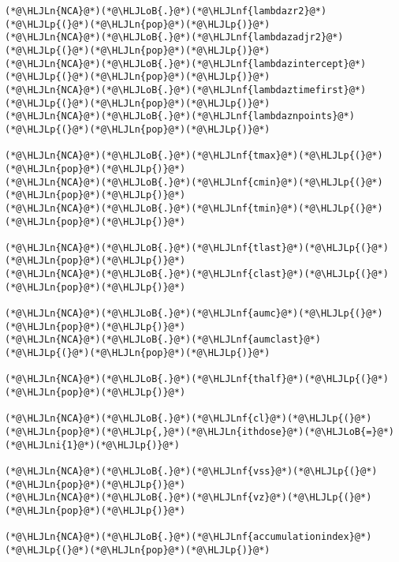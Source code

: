 \documentclass[12pt,a4paper]{article}
\newcommand{\HLJLn}[1]{#1}
\newcommand{\HLJLnf}[1]{\textcolor[RGB]{66,102,213}{#1}}
\newcommand{\HLJLni}[1]{\textcolor[RGB]{59,151,46}{#1}}
\newcommand{\HLJLoB}[1]{\textcolor[RGB]{102,102,102}{\textbf{#1}}}
\newcommand{\HLJLp}[1]{#1}
\begin{document}
\begin{lstlisting}
(*@\HLJLn{NCA}@*)(*@\HLJLoB{.}@*)(*@\HLJLnf{lambdazr2}@*)(*@\HLJLp{(}@*)(*@\HLJLn{pop}@*)(*@\HLJLp{)}@*)
(*@\HLJLn{NCA}@*)(*@\HLJLoB{.}@*)(*@\HLJLnf{lambdazadjr2}@*)(*@\HLJLp{(}@*)(*@\HLJLn{pop}@*)(*@\HLJLp{)}@*)
(*@\HLJLn{NCA}@*)(*@\HLJLoB{.}@*)(*@\HLJLnf{lambdazintercept}@*)(*@\HLJLp{(}@*)(*@\HLJLn{pop}@*)(*@\HLJLp{)}@*)
(*@\HLJLn{NCA}@*)(*@\HLJLoB{.}@*)(*@\HLJLnf{lambdaztimefirst}@*)(*@\HLJLp{(}@*)(*@\HLJLn{pop}@*)(*@\HLJLp{)}@*)
(*@\HLJLn{NCA}@*)(*@\HLJLoB{.}@*)(*@\HLJLnf{lambdaznpoints}@*)(*@\HLJLp{(}@*)(*@\HLJLn{pop}@*)(*@\HLJLp{)}@*)

(*@\HLJLn{NCA}@*)(*@\HLJLoB{.}@*)(*@\HLJLnf{tmax}@*)(*@\HLJLp{(}@*)(*@\HLJLn{pop}@*)(*@\HLJLp{)}@*)
(*@\HLJLn{NCA}@*)(*@\HLJLoB{.}@*)(*@\HLJLnf{cmin}@*)(*@\HLJLp{(}@*)(*@\HLJLn{pop}@*)(*@\HLJLp{)}@*)
(*@\HLJLn{NCA}@*)(*@\HLJLoB{.}@*)(*@\HLJLnf{tmin}@*)(*@\HLJLp{(}@*)(*@\HLJLn{pop}@*)(*@\HLJLp{)}@*)

(*@\HLJLn{NCA}@*)(*@\HLJLoB{.}@*)(*@\HLJLnf{tlast}@*)(*@\HLJLp{(}@*)(*@\HLJLn{pop}@*)(*@\HLJLp{)}@*)
(*@\HLJLn{NCA}@*)(*@\HLJLoB{.}@*)(*@\HLJLnf{clast}@*)(*@\HLJLp{(}@*)(*@\HLJLn{pop}@*)(*@\HLJLp{)}@*)

(*@\HLJLn{NCA}@*)(*@\HLJLoB{.}@*)(*@\HLJLnf{aumc}@*)(*@\HLJLp{(}@*)(*@\HLJLn{pop}@*)(*@\HLJLp{)}@*)
(*@\HLJLn{NCA}@*)(*@\HLJLoB{.}@*)(*@\HLJLnf{aumclast}@*)(*@\HLJLp{(}@*)(*@\HLJLn{pop}@*)(*@\HLJLp{)}@*)

(*@\HLJLn{NCA}@*)(*@\HLJLoB{.}@*)(*@\HLJLnf{thalf}@*)(*@\HLJLp{(}@*)(*@\HLJLn{pop}@*)(*@\HLJLp{)}@*)

(*@\HLJLn{NCA}@*)(*@\HLJLoB{.}@*)(*@\HLJLnf{cl}@*)(*@\HLJLp{(}@*)(*@\HLJLn{pop}@*)(*@\HLJLp{,}@*)(*@\HLJLn{ithdose}@*)(*@\HLJLoB{=}@*)(*@\HLJLni{1}@*)(*@\HLJLp{)}@*)

(*@\HLJLn{NCA}@*)(*@\HLJLoB{.}@*)(*@\HLJLnf{vss}@*)(*@\HLJLp{(}@*)(*@\HLJLn{pop}@*)(*@\HLJLp{)}@*)
(*@\HLJLn{NCA}@*)(*@\HLJLoB{.}@*)(*@\HLJLnf{vz}@*)(*@\HLJLp{(}@*)(*@\HLJLn{pop}@*)(*@\HLJLp{)}@*)

(*@\HLJLn{NCA}@*)(*@\HLJLoB{.}@*)(*@\HLJLnf{accumulationindex}@*)(*@\HLJLp{(}@*)(*@\HLJLn{pop}@*)(*@\HLJLp{)}@*)
\end{lstlisting}
\end{document}
